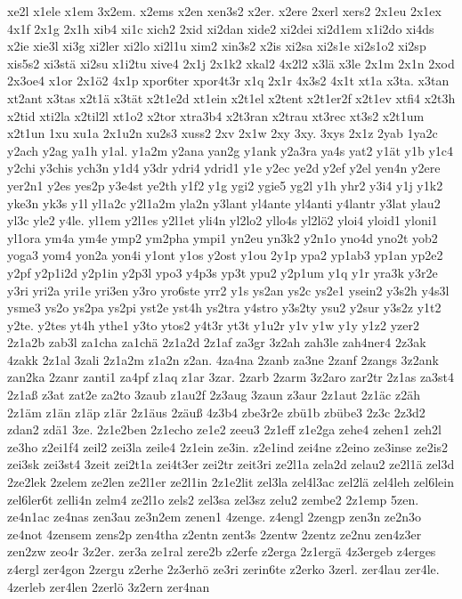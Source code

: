{xe2l
x1ele
x1em
3x2em.
x2ems
x2en
xen3s2
x2er.
x2ere
2xerl
xers2
2x1eu
2x1ex
4x1f
2x1g
2x1h
xib4
xi1c
xich2
2xid
xi2dan
xide2
xi2dei
xi2d1em
x1i2do
xi4ds
x2ie
xie3l
xi3g
xi2ler
xi2lo
xi2l1u
xim2
xin3s2
x2is
xi2sa
xi2s1e
xi2s1o2
xi2sp
xis5s2
xi3stä
xi2su
x1i2tu
xive4
2x1j
2x1k2
xkal2
4x2l2
x3lä
x3le
2x1m
2x1n
2xod
2x3oe4
x1or
2x1ö2
4x1p
xpor6ter
xpor4t3r
x1q
2x1r
4x3s2
4x1t
xt1a
x3ta.
x3tan
xt2ant
x3tas
x2t1ä
x3tät
x2t1e2d
xt1ein
x2t1el
x2tent
x2t1er2f
x2t1ev
xtfi4
x2t3h
x2tid
xti2la
x2til2l
xt1o2
x2tor
xtra3b4
x2t3ran
x2trau
xt3rec
xt3s2
x2t1um
x2t1un
1xu
xu1a
2x1u2n
xu2s3
xuss2
2xv
2x1w
2xy
3xy.
3xys
2x1z
2yab
1ya2c
y2ach
y2ag
ya1h
y1al.
y1a2m
y2ana
yan2g
y1ank
y2a3ra
ya4s
yat2
y1ät
y1b
y1c4
y2chi
y3chis
ych3n
y1d4
y3dr
ydri4
ydrid1
y1e
y2ec
ye2d
y2ef
y2el
yen4n
y2ere
yer2n1
y2es
yes2p
y3e4st
ye2th
y1f2
y1g
ygi2
ygie5
yg2l
y1h
yhr2
y3i4
y1j
y1k2
yke3n
yk3s
y1l
yl1a2c
y2l1a2m
yla2n
y3lant
yl4ante
yl4anti
y4lantr
y3lat
ylau2
yl3c
yle2
y4le.
yl1em
y2l1es
y2l1et
yli4n
yl2lo2
yllo4s
yl2lö2
yloi4
yloid1
yloni1
yl1ora
ym4a
ym4e
ymp2
ym2pha
ympi1
yn2eu
yn3k2
y2n1o
yno4d
yno2t
yob2
yoga3
yom4
yon2a
yon4i
y1ont
y1os
y2ost
y1ou
2y1p
ypa2
yp1ab3
yp1an
yp2e2
y2pf
y2p1i2d
y2p1in
y2p3l
ypo3
y4p3s
yp3t
ypu2
y2p1um
y1q
y1r
yra3k
y3r2e
y3ri
yri2a
yri1e
yri3en
y3ro
yro6ste
yrr2
y1s
ys2an
ys2c
ys2e1
ysein2
y3s2h
y4s3l
ysme3
ys2o
ys2pa
ys2pi
yst2e
yst4h
ys2tra
y4stro
y3s2ty
ysu2
y2sur
y3s2z
y1t2
y2te.
y2tes
yt4h
ythe1
y3to
ytos2
y4t3r
yt3t
y1u2r
y1v
y1w
y1y
y1z2
yzer2
2z1a2b
zab3l
za1cha
za1chä
2z1a2d
2z1af
za3gr
3z2ah
zah3le
zah4ner4
2z3ak
4zakk
2z1al
3zali
2z1a2m
z1a2n
z2an.
4za4na
2zanb
za3ne
2zanf
2zangs
3z2ank
zan2ka
2zanr
zanti1
za4pf
z1aq
z1ar
3zar.
2zarb
2zarm
3z2aro
zar2tr
2z1as
za3st4
2z1aß
z3at
zat2e
za2to
3zaub
z1au2f
2z3aug
3zaun
z3aur
2z1aut
2z1äc
z2äh
2z1äm
z1än
z1äp
z1är
2z1äus
2zäuß
4z3b4
zbe3r2e
zbü1b
zbübe3
2z3c
2z3d2
zdan2
zdä1
3ze.
2z1e2ben
2z1echo
ze1e2
zeeu3
2z1eff
z1e2ga
zehe4
zehen1
zeh2l
ze3ho
z2ei1f4
zeil2
zei3la
zeile4
2z1ein
ze3in.
z2e1ind
zei4ne
z2eino
ze3inse
ze2is2
zei3sk
zei3st4
3zeit
zei2t1a
zei4t3er
zei2tr
zeit3ri
ze2l1a
zela2d
zelau2
ze2l1ä
zel3d
2ze2lek
2zelem
ze2len
ze2l1er
ze2l1in
2z1e2lit
zel3la
zel4l3ac
zel2lä
zel4leh
zel6lein
zel6ler6t
zelli4n
zelm4
ze2l1o
zels2
zel3sa
zel3sz
zelu2
zembe2
2z1emp
5zen.
ze4n1ac
ze4nas
zen3au
ze3n2em
zenen1
4zenge.
z4engl
2zengp
zen3n
ze2n3o
ze4not
4zensem
zens2p
zen4tha
z2entn
zent3s
2zentw
2zentz
ze2nu
zen4z3er
zen2zw
zeo4r
3z2er.
zer3a
ze1ral
zere2b
z2erfe
z2erga
2z1ergä
4z3ergeb
z4erges
z4ergl
zer4gon
2zergu
z2erhe
2z3erhö
ze3ri
zerin6te
z2erko
3zerl.
zer4lau
zer4le.
4zerleb
zer4len
2zerlö
3z2ern
zer4nan
}

